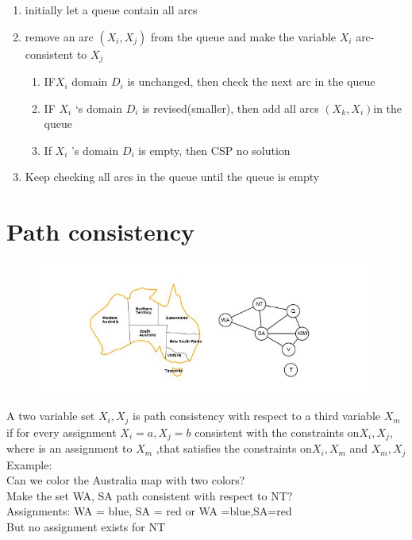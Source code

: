 \begin{enumerate}
\item initially let a queue contain all arcs
\item remove an arc $(X_i , X_j)$ from the queue and make the variable $X_i$ arc-consistent to $X_j$
\begin{enumerate}
\item IF$ X_i$ domain $D_i$ is unchanged, then check the next arc in the queue
\item IF $X_i$ ‘s domain $D_i$ is revised(smaller), then add all arcs $(X_k, X_i) $in the queue 
\item If $X_i$ ’s domain $D_i$ is empty, then CSP no solution
\end{enumerate}
\item Keep checking all arcs in the queue until the queue is empty 
\end{enumerate}

\section{Path consistency}
\begin{figure}[h]
\centering
\includegraphics[width=1\textwidth]{chap1_pics/patchconsistency.jpeg} 
\end{figure}

A two variable set ${X_i,X_j}$ is path consistency with respect to a third variable $X_m$ if for every assignment ${X_i = a, X_j = b}$ consistent with the constraints on${X_i, X_j}$, where is an assignment to $X_m$ ,that satisfies the constraints on${X_i , X_m}$ and ${X_m, X_j}$ \\[3ex]

Example:\\
Can we color the Australia map with two colors?\\
Make the set {WA, SA} path consistent with respect to NT?\\
Assignments: {WA = blue, SA = red} or {WA =blue,SA=red}\\
But no assignment exists for NT\\[3ex]

